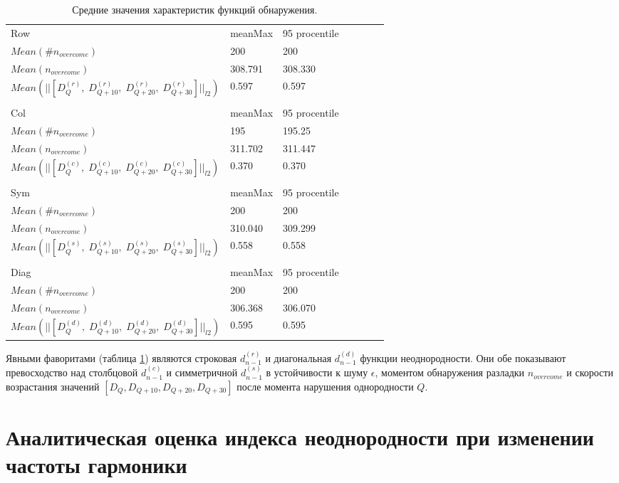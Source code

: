 \documentclass[specialist, substylefile = spbu.rtx,
			   subf, href, 12pt]{disser}
\begin{document}
\begin{table}[!hhh]
	\caption{Средние значения характеристик функций обнаружения.}
	\begin{tabular}{lllllll}
		Row & meanMax & 95 procentile \\
		$Mean(\#n_{overcome})$ & 200 & 200 \\
		$Mean(n_{overcome})$ & 308.791 & 308.330 \\
		$Mean(||[D_Q^{(r)},\; D_{Q+10}^{(r)},\; D_{Q+20}^{(r)},\; D_{Q+30}^{(r)}]||_{l2})$ & 0.597 & 0.597 \\
		&  &  \\
		Col & meanMax & 95 procentile \\
		$Mean(\#n_{overcome})$ & 195 & 195.25 \\
		$Mean(n_{overcome})$ & 311.702 & 311.447 \\
		$Mean(||[D_Q^{(c)},\; D_{Q+10}^{(c)},\; D_{Q+20}^{(c)},\; D_{Q+30}^{(c)}]||_{l2})$ & 0.370 & 0.370 \\
		&  &  \\
		Sym & meanMax & 95 procentile \\
		$Mean(\#n_{overcome})$ & 200 & 200 \\
		$Mean(n_{overcome})$ & 310.040 & 309.299 \\
		$Mean(||[D_Q^{(s)},\; D_{Q+10}^{(s)},\; D_{Q+20}^{(s)},\; D_{Q+30}^{(s)}]||_{l2})$ & 0.558 & 0.558 \\
		&  &  \\
		Diag & meanMax & 95 procentile \\
		$Mean(\#n_{overcome})$ & 200 & 200 \\
		$Mean(n_{overcome})$ & 306.368 & 306.070 \\
		$Mean(||[D_Q^{(d)},\; D_{Q+10}^{(d)},\; D_{Q+20}^{(d)},\; D_{Q+30}^{(d)}]||_{l2})$ & 0.595 & 0.595
	\end{tabular}
	\label{tab:AvgResultsNoise}
\end{table}

Явными фаворитами (таблица \ref{tab:AvgResultsNoise}) являются строковая $d_{n-1}^{(r)}$ и диагональная $d_{n-1}^{(d)}$ функции неоднородности. Они обе показывают превосходство над столбцовой $d_{n-1}^{(c)}$ и симметричной $d_{n-1}^{(s)}$ в устойчивости к шуму $\epsilon$, моментом обнаружения разладки $n_{overcome}$ и скорости возрастания значений $[D_Q, D_{Q+10}, D_{Q+20}, D_{Q+30}]$ после момента нарушения однородности $Q$.


\newpage
\chapter{Аналитическая оценка индекса неоднородности при изменении частоты гармоники}
\end{document}
